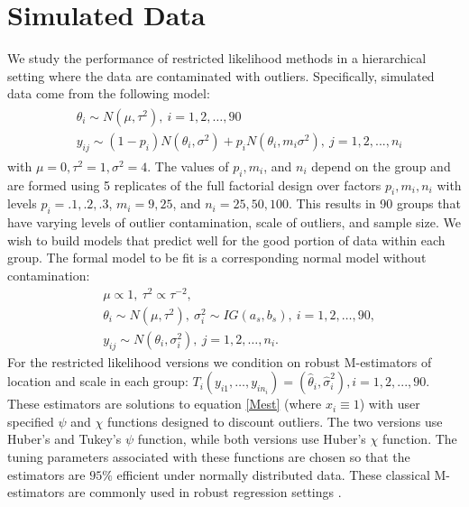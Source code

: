 \documentclass[ba]{imsart}
\begin{document}
%
%

\section{Simulated Data}
\label{simData}
We study the performance of restricted likelihood methods in a hierarchical setting where the data are contaminated with outliers. Specifically, simulated data come from the following model:
\begin{align}
\label{gensim2}
\begin{split}
& \theta_{i}  \sim   N(\mu, \tau^{2}),  \ i = 1, 2, \dots, 90  \\ 
& y_{ij} \sim (1-p_{i})N(\theta_{i}, \sigma^{2}) + p_{i}N(\theta_{i}, m_{i}\sigma^{2}),\  j = 1, 2,..., n_{i}
\end{split}
\end{align}
with $\mu = 0, \tau^{2} = 1, \sigma^{2} = 4$. The values of $p_{i}, m_{i}$, and $n_{i}$ depend on the group and are formed using 5 replicates of the full factorial design over factors $p_{i},m_{i},n_{i}$ with levels $p_{i} = .1, .2, .3$, $m_{i} = 9, 25$, and $n_{i} = 25, 50, 100$. This results in 90 groups that have varying levels of outlier contamination, scale of outliers, and sample size. We wish to build models that predict well for the good portion of data within each group. The formal model to be fit is a corresponding normal model without contamination:
\begin{equation}
\label{fullsim2}
\begin{split}
& \mu \propto 1, \  \tau^{2} \propto \tau^{-2}, \\
& \theta_{i}\sim N(\mu, \tau^{2}), \  \sigma^{2}_{i} \sim IG(a_{s}, b_{s}),  \ i = 1, 2, \dots, 90, \\ 
& y_{ij}\sim  N(\theta_{i},\sigma^{2}_{i}), \ j = 1, 2, \dots, n_{i}.
\end{split}
\end{equation}
For the restricted likelihood versions we condition on robust M-estimators of location and scale in each group: $T_{i}(y_{i1}, \dots, y_{in_{i}}) = (\hat\theta_{i}, \hat\sigma^{2}_{i}), i = 1, 2, ..., 90$.  These estimators are solutions to equation \eqref{Mest} (where $x_{i}\equiv 1$) with user specified $\psi$ and $\chi$ functions designed to discount outliers. The two versions use Huber's and Tukey's $\psi$ function, while both versions use Huber's $\chi$ function. The tuning parameters associated with these functions are chosen so that the estimators are $95\%$ efficient under normally distributed data. These classical M-estimators are commonly used in robust regression settings  \citep{huber2009}.  %
\end{document}

